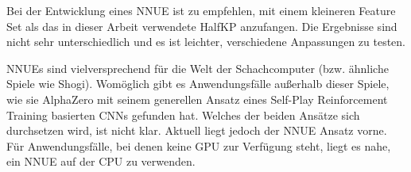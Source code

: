 Bei der Entwicklung eines \ac{NNUE} ist zu empfehlen, mit einem kleineren Feature Set als das in dieser Arbeit verwendete HalfKP anzufangen. Die Ergebnisse sind nicht sehr unterschiedlich und es ist leichter, verschiedene Anpassungen zu testen.

\acp{NNUE} sind vielversprechend für die Welt der Schachcomputer (bzw. ähnliche Spiele wie \zb{} Shogi). Womöglich gibt es Anwendungsfälle außerhalb dieser Spiele, wie sie AlphaZero mit seinem generellen Ansatz eines Self-Play Reinforcement Training basierten \acp{CNN} gefunden hat. Welches der beiden Ansätze sich durchsetzen wird, ist nicht klar. Aktuell liegt jedoch der \ac{NNUE} Ansatz vorne. Für Anwendungsfälle, bei denen keine GPU zur Verfügung steht, liegt es nahe, ein \ac{NNUE} auf der CPU zu verwenden.